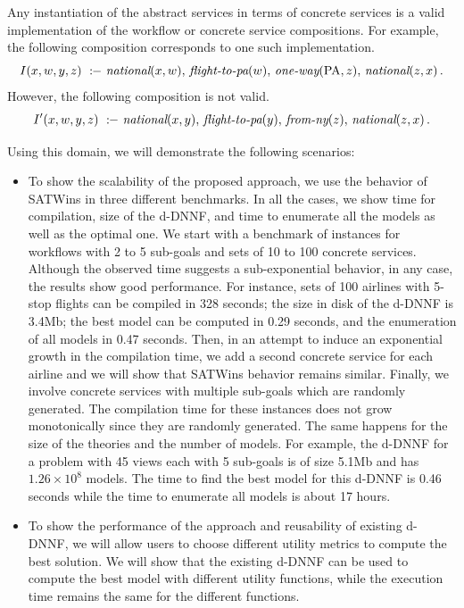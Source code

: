 \documentclass{llncs}
\newcommand{\qrule}{:\!\!-}
\newcommand{\national}{\text{\it national}}
\newcommand{\oneway}{\text{\it one-way}}
\newcommand{\flightPA}{\text{\it flight-to-pa}}
\newcommand{\fromNY}{\text{\it from-ny}}
\newcommand{\PA}{\text{PA}}
\begin{document}
Any instantiation of the abstract services in terms of
concrete services is a valid implementation of the workflow or concrete service compositions.
For example, the following composition corresponds to one such implementation.
\[ I(x,w,y,z)\ \qrule\ \national(x,w),\,\flightPA(w),\,\oneway(\PA,z),\,\national(z,x)\,. \]
However, the following composition is not valid.
\begin{alignat*}{1}
I'(x,w,y,z)\  \qrule\ &\national(x,y),\,\flightPA(y),\,\fromNY(z),\,\national(z,x)\,. \\
\end{alignat*}

Using this domain, we will demonstrate the following scenarios:
\begin{itemize}
\item To show the scalability of the proposed approach, we use the behavior of
SATWins in three different benchmarks. In all the cases, we show time for
compilation, size of the  d-DNNF, and time to enumerate all the models as well
as the optimal one. We start with a benchmark of instances for workflows with 2
to 5 sub-goals and sets of 10 to 100 concrete services. Although the observed
time suggests a sub-exponential behavior, in any case, the results
show good performance. For instance, sets of 100
airlines with 5-stop flights can be compiled in 328 seconds; the size in disk of the d-DNNF is 3.4Mb;
the best model can be computed in 0.29 seconds, and the enumeration of all models in 0.47 seconds.
Then, in an attempt to induce an exponential growth in the compilation time, we add a second concrete service for each airline and we will show that SATWins behavior remains similar. Finally, we  involve concrete services with multiple sub-goals which are randomly generated.  The compilation time for these instances does not grow monotonically
since they are randomly generated. The same happens for the size of
the theories and the number of models. For example, the d-DNNF for 
a problem with 45 views each with 5 sub-goals is of size 5.1Mb and has
$1.26\times 10^8$ models. The time to find the best model for
this d-DNNF is 0.46 seconds while the time to enumerate all models
is about 17 hours.
\item To show the performance of the approach and reusability of existing d-DNNF, we will allow users to choose different utility metrics to compute the best solution.  We will show that the existing d-DNNF can be used to compute the best model with different utility functions, while the execution time remains the same for the different functions. 
\end{itemize}
\end{document}
